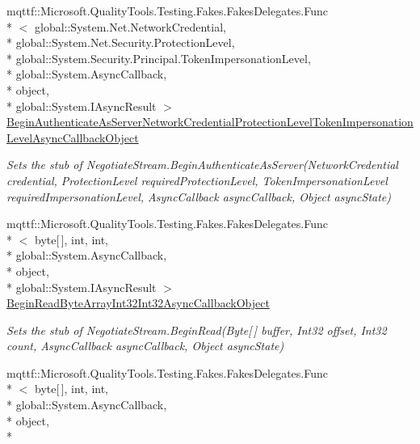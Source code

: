\begin{DoxyCompactItemize}
mqttf\-::\-Microsoft.\-Quality\-Tools.\-Testing.\-Fakes.\-Fakes\-Delegates.\-Func\\*
$<$ global\-::\-System.\-Net.\-Network\-Credential, \\*
global\-::\-System.\-Net.\-Security.\-Protection\-Level, \\*
global\-::\-System.\-Security.\-Principal.\-Token\-Impersonation\-Level, \\*
global\-::\-System.\-Async\-Callback, \\*
object, \\*
global\-::\-System.\-I\-Async\-Result $>$ \hyperlink{class_system_1_1_net_1_1_security_1_1_fakes_1_1_stub_negotiate_stream_a2edb1fae407f3300254e1681659af588}{Begin\-Authenticate\-As\-Server\-Network\-Credential\-Protection\-Level\-Token\-Impersonation\-Level\-Async\-Callback\-Object}
\begin{DoxyCompactList}\small\item\em Sets the stub of Negotiate\-Stream.\-Begin\-Authenticate\-As\-Server(\-Network\-Credential credential, Protection\-Level required\-Protection\-Level, Token\-Impersonation\-Level required\-Impersonation\-Level, Async\-Callback async\-Callback, Object async\-State)\end{DoxyCompactList}\item 
mqttf\-::\-Microsoft.\-Quality\-Tools.\-Testing.\-Fakes.\-Fakes\-Delegates.\-Func\\*
$<$ byte\mbox{[}$\,$\mbox{]}, int, int, \\*
global\-::\-System.\-Async\-Callback, \\*
object, \\*
global\-::\-System.\-I\-Async\-Result $>$ \hyperlink{class_system_1_1_net_1_1_security_1_1_fakes_1_1_stub_negotiate_stream_a8e59a06ff3bde15658924f7dad554abf}{Begin\-Read\-Byte\-Array\-Int32\-Int32\-Async\-Callback\-Object}
\begin{DoxyCompactList}\small\item\em Sets the stub of Negotiate\-Stream.\-Begin\-Read(\-Byte\mbox{[}$\,$\mbox{]} buffer, Int32 offset, Int32 count, Async\-Callback async\-Callback, Object async\-State)\end{DoxyCompactList}\item 
mqttf\-::\-Microsoft.\-Quality\-Tools.\-Testing.\-Fakes.\-Fakes\-Delegates.\-Func\\*
$<$ byte\mbox{[}$\,$\mbox{]}, int, int, \\*
global\-::\-System.\-Async\-Callback, \\*
object, \\*

\end{DoxyCompactItemize}
